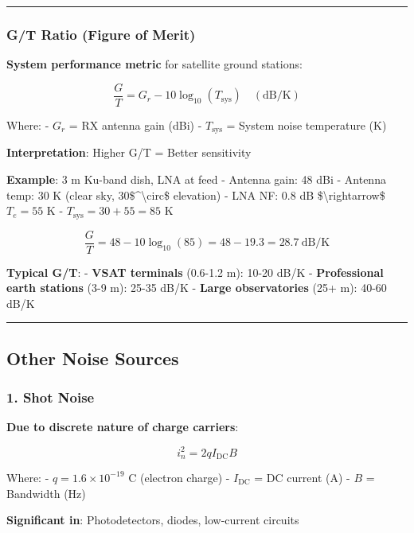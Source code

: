\begin{center}\rule{0.5\linewidth}{0.5pt}\end{center}

\subsubsection{G/T Ratio (Figure of
Merit)}\label{gt-ratio-figure-of-merit}

\textbf{System performance metric} for satellite ground stations:

\[
\frac{G}{T} = G_r - 10\log_{10}(T_{\text{sys}}) \quad (\text{dB/K})
\]

Where: - \(G_r\) = RX antenna gain (dBi) - \(T_{\text{sys}}\) = System
noise temperature (K)

\textbf{Interpretation}: Higher G/T = Better sensitivity

\textbf{Example}: 3 m Ku-band dish, LNA at feed - Antenna gain: 48 dBi -
Antenna temp: 30 K (clear sky, 30\$\^{}\textbackslash circ\$ elevation)
- LNA NF: 0.8 dB \$\textbackslash rightarrow\$ \(T_e = 55\) K -
\(T_{\text{sys}} = 30 + 55 = 85\) K

\[
\frac{G}{T} = 48 - 10\log_{10}(85) = 48 - 19.3 = 28.7\ \text{dB/K}
\]

\textbf{Typical G/T}: - \textbf{VSAT terminals} (0.6-1.2 m): 10-20 dB/K
- \textbf{Professional earth stations} (3-9 m): 25-35 dB/K -
\textbf{Large observatories} (25+ m): 40-60 dB/K

\begin{center}\rule{0.5\linewidth}{0.5pt}\end{center}

\subsection{Other Noise Sources}\label{other-noise-sources}

\subsubsection{1. Shot Noise}\label{shot-noise}

\textbf{Due to discrete nature of charge carriers}:

\[
i_n^2 = 2 q I_{\text{DC}} B
\]

Where: - \(q = 1.6 \times 10^{-19}\) C (electron charge) -
\(I_{\text{DC}}\) = DC current (A) - \(B\) = Bandwidth (Hz)

\textbf{Significant in}: Photodetectors, diodes, low-current circuits

